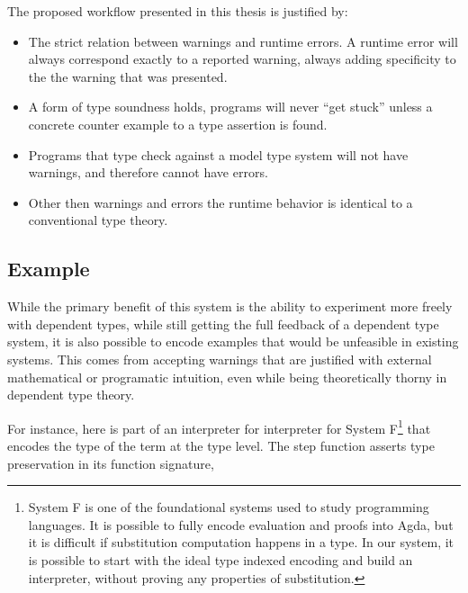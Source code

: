 The proposed workflow presented in this thesis is justified by: 
\begin{itemize}
\item The strict relation between warnings and runtime errors.
A runtime error will always correspond exactly to a reported warning, always adding specificity to the the warning that was presented.
\item A form of type soundness holds, programs will never ``get stuck'' unless a concrete counter example to a type assertion is found.
\item Programs that type check against a model type system will not have warnings, and therefore cannot have errors.
\item Other then warnings and errors the runtime behavior is identical to a conventional type theory.
\end{itemize}

\subsection{Example}

While the primary benefit of this system is the ability to experiment more freely with dependent types, while still getting the full feedback of a dependent type system, it is also possible to encode examples that would be unfeasible in existing systems.
This comes from accepting warnings that are justified with external mathematical or programatic intuition, even while being theoretically thorny in dependent type theory.

For instance, here is part of an interpreter for interpreter for System F\footnote{
  System F is one of the foundational systems used to study programming languages.
  It is possible to fully encode evaluation and proofs into Agda, but it is difficult if substitution computation happens in a type.
  In our system, it is possible to start with the ideal type indexed encoding and build an interpreter, without proving any properties of substitution.
} that encodes the type of the term at the type level. The step function asserts type preservation in its function signature,

